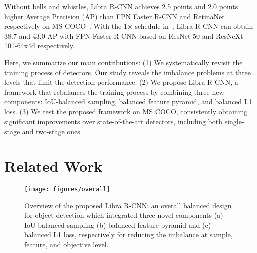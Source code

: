 \documentclass[10pt,twocolumn,letterpaper]{article}
\begin{document}
Without bells and whistles, Libra R-CNN
achieves 2.5 points and 2.0 points higher Average Precision (AP) than FPN Faster R-CNN and
RetinaNet respectively on MS COCO~\cite{coco}.
With the 1$\times$ schedule in~\cite{Detectron2018},
Libra R-CNN can obtain 38.7 and 43.0 AP with FPN Faster R-CNN based on ResNet-50
and ResNeXt-101-64x4d respectively.

Here, we summarize our main contributions:
(1) We systematically revisit the training process of detectors.
Our study reveals the imbalance problems at three levels that limit the
detection performance.
(2) We propose Libra R-CNN, a framework that rebalances the training
process by combining three new components: IoU-balanced sampling,
balanced feature pyramid, and balanced L1 loss.
(3) We test the proposed framework on MS COCO, consistently obtaining
significant improvements over state-of-the-art detectors, including
both single-stage and two-stage ones.
 

\section{Related Work}

\begin{figure*}
	\centering
	\texttt{[image: figures/overall]}
	\caption{Overview of the proposed Libra R-CNN:
		an overall balanced design for object detection which integrated three novel components (a) IoU-balanced sampling (b) balanced feature pyramid and (c) balanced L1 loss, respectively for reducing the imbalance at sample, feature, and objective level.}
	\label{fig:overall}
\end{figure*}

\vspace{0pt}
\end{document}
